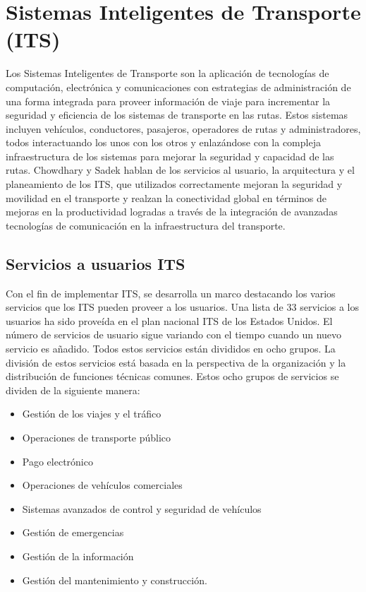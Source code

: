 \section{Sistemas Inteligentes de Transporte (ITS)}

Los Sistemas Inteligentes de Transporte son la aplicación de tecnologías de computación, electrónica y comunicaciones con estrategias de administración de una forma integrada para proveer información de viaje para incrementar la seguridad y eficiencia de los sistemas de transporte en las rutas. Estos sistemas incluyen vehículos, conductores, pasajeros, operadores de rutas y administradores, todos interactuando los unos con los otros y enlazándose con la compleja infraestructura de los sistemas para mejorar la seguridad y capacidad de las rutas. Chowdhary y Sadek \cite{chowdhury2003fundamentals} hablan de los servicios al usuario, la arquitectura y el planeamiento de los ITS, que utilizados correctamente mejoran la seguridad y movilidad en el transporte y realzan la conectividad global en términos de mejoras en la productividad logradas a través de la integración de avanzadas tecnologías de comunicación en la infraestructura del transporte.

\subsection{Servicios a usuarios ITS}

Con el fin de implementar ITS, se desarrolla un marco destacando los varios servicios que los ITS pueden proveer a los usuarios. Una lista de 33 servicios a los usuarios ha sido proveída en el plan nacional ITS de los Estados Unidos. El número de servicios de usuario sigue variando con el tiempo cuando un nuevo servicio es añadido. Todos estos servicios están divididos en ocho grupos. La división de estos servicios está basada en la perspectiva de la organización y la distribución de funciones técnicas comunes. Estos ocho grupos de servicios se dividen de la siguiente manera:

\begin{itemize}
\item Gestión de los viajes y el tráfico

\item Operaciones de transporte público

\item Pago electrónico

\item Operaciones de vehículos comerciales

\item Sistemas avanzados de control y seguridad de vehículos

\item Gestión de emergencias

\item Gestión de la información

\item Gestión del mantenimiento y construcción.
\end{itemize}

